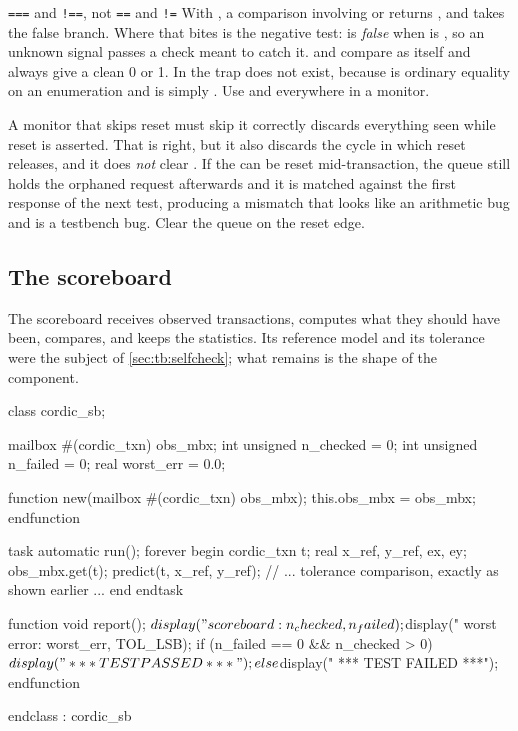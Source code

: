 \begin{gotcha}{\texttt{===} and \texttt{!==}, not \texttt{==} and \texttt{!=}}
With \code{==}, a comparison involving  or  returns
, and  takes the false branch. Where that bites is
the negative test:  is \emph{false} when  is
, so an unknown signal passes a check meant to catch it. \code{===} and
\code{!==} compare  as itself and always give a clean 0 or 1. In
\VHDL{} the trap does not exist, because  is ordinary equality
on an enumeration and is simply . Use \code{===} and \code{!==}
everywhere in a monitor.
\end{gotcha}

\begin{gotcha}{A monitor that skips reset must skip it correctly}
 discards everything seen while reset
is asserted. That is right, but it also discards the cycle in which reset
releases, and it does \emph{not} clear . If the \DUT{} can be
reset mid-transaction, the queue still holds the orphaned request afterwards
and it is matched against the first response of the next test, producing a
mismatch that looks like an arithmetic bug and is a testbench bug. Clear the
queue on the reset edge.
\end{gotcha}

\subsection{The scoreboard}

The scoreboard receives observed transactions, computes what
they should have been, compares, and keeps the statistics. Its reference model
and its tolerance were the subject of \cref{sec:tb:selfcheck}; what remains is
the shape of the component.

\begin{svcode}[caption={The scoreboard from \file{tb\_cordic\_pkg.sv}},label={lst:tb:sb}]
class cordic_sb;

  mailbox #(cordic_txn) obs_mbx;
  int unsigned n_checked = 0;
  int unsigned n_failed  = 0;
  real         worst_err = 0.0;

  function new(mailbox #(cordic_txn) obs_mbx);
    this.obs_mbx = obs_mbx;
  endfunction

  task automatic run();
    forever begin
      cordic_txn t;
      real x_ref, y_ref, ex, ey;
      obs_mbx.get(t);
      predict(t, x_ref, y_ref);
      // ... tolerance comparison, exactly as shown earlier ...
    end
  endtask

  function void report();
    $display(" scoreboard: %
             n_checked, n_failed);
    $display(" worst error: %
             worst_err, TOL_LSB);
    if (n_failed == 0 && n_checked > 0) $display(" *** TEST PASSED ***");
    else                                $display(" *** TEST FAILED ***");
  endfunction

endclass : cordic_sb
\end{svcode}

